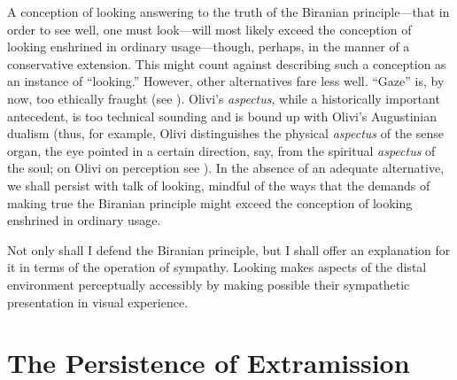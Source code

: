 A conception of looking answering to the truth of the Biranian principle---that in order to see well, one must look---will most likely exceed the conception of looking enshrined in ordinary usage---though, perhaps, in the manner of a conservative extension. This might count against describing such a conception as an instance of ``looking.'' However, other alternatives fare less well. ``Gaze'' is, by now, too ethically fraught (see \citealt{Jay:1994aa}). Olivi's \emph{aspectus}, while a historically important antecedent, is too technical sounding and is bound up with Olivi's Augustinian dualism (thus, for example, Olivi distinguishes the physical \emph{aspectus} of the sense organ, the eye pointed in a certain direction, say, from the spiritual \emph{aspectus} of the soul; on Olivi on perception see \citealt{Pasnau:1997aa,Silva:2010zh,Toivanen:2013ul}). In the absence of an adequate alternative, we shall persist with talk of looking, mindful of the ways that the demands of making true the Biranian principle might exceed the conception of looking enshrined in ordinary usage.

Not only shall I defend the Biranian principle, but I shall offer an explanation for it in terms of the operation of sympathy. Looking makes aspects of the distal environment perceptually accessibly by making possible their sympathetic presentation in visual experience.


\section{The Persistence of Extramission} %
\label{sec:the_persistence_of_extramission}

